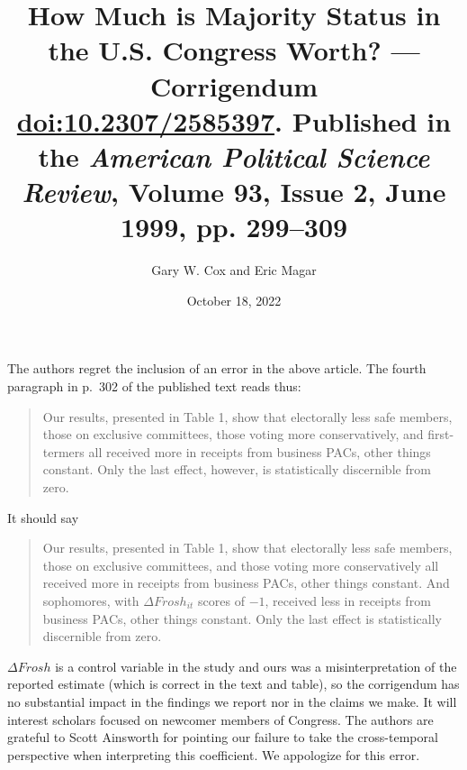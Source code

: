 \documentclass[11pt]{article}
\author{Gary W. Cox and Eric Magar}
\date{October 18, 2022}
\title{How Much is Majority Status in the U.S. Congress Worth? --- Corrigendum\\\medskip
\large \url{doi:10.2307/2585397}. Published in the \emph{American Political Science Review}, Volume 93, Issue 2, June 1999, pp. 299--309}
\begin{document}
\maketitle
\noindent The authors regret the inclusion of an error in the above article. The fourth paragraph in p.\ 302 of the published text reads thus:

\begin{quote}
Our results, presented in Table 1, show that electorally less safe members, those on exclusive committees, those voting more conservatively, and first-termers all received more in receipts from business PACs, other things constant. Only the last effect, however, is statistically discernible from zero.
\end{quote}

\noindent It should say

\begin{quote}
Our results, presented in Table 1, show that electorally less safe members, those on exclusive committees, and those voting more conservatively all received more in receipts from business PACs, other things constant. And sophomores, with $\Delta Frosh_{it}$ scores of $-1$, received less in receipts from business PACs, other things constant. Only the last effect is statistically discernible from zero.
\end{quote}

\bigskip \noindent $\Delta Frosh$ is a control variable in the study and ours was a misinterpretation of the reported estimate (which is correct in the text and table), so the corrigendum has no substantial impact in the findings we report nor in the claims we make. It will interest scholars focused on newcomer members of Congress. The authors are grateful to Scott Ainsworth for pointing our failure to take the cross-temporal perspective when interpreting this coefficient. We appologize for this error.
\end{document}
